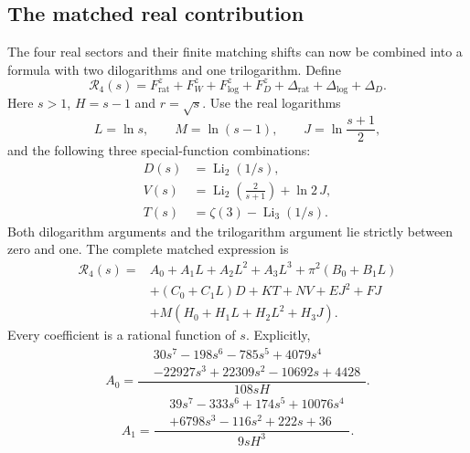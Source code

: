 \subsection{The matched real contribution}
The four real sectors and their finite matching shifts can now be combined into a formula with two dilogarithms and one trilogarithm. Define
\begin{equation}
 \mathcal R_4(s)=F_{\mathrm{rat}}^z+F_W^z+F_{\log}^z+F_D^z
                    +\Delta_{\mathrm{rat}}+\Delta_{\log}+\Delta_D.
\end{equation}
Here $s>1$, $H=s-1$ and $r=\sqrt{s}$. Use the real logarithms
\begin{equation}
 L=\ln s,\qquad M=\ln(s-1),\qquad J=\ln\frac{s+1}{2},
\end{equation}
and the following three special-function combinations:
\begin{align}
 D(s)&=\operatorname{Li}_2(1/s),\\
 V(s)&=\operatorname{Li}_2\!\left(\frac2{s+1}\right)+\ln2\,J,\\
 T(s)&=\zeta(3)-\operatorname{Li}_3(1/s).
\end{align}
Both dilogarithm arguments and the trilogarithm argument lie strictly between zero and one. The complete matched expression is
\begin{equation}
\begin{aligned}
 \mathcal R_4(s)={}&A_0+A_1L+A_2L^2+A_3L^3
                  +\pi^2(B_0+B_1L)\\
 &+(C_0+C_1L)D+KT+NV+EJ^2+FJ\\
 &+M(H_0+H_1L+H_2L^2+H_3J).
\end{aligned}
\label{eq:comp-real-four-matched-compact}
\end{equation}
Every coefficient is a rational function of $s$. Explicitly,
\begin{equation}
A_0=\frac{\begin{aligned}&30 s^{7} - 198 s^{6} - 785 s^{5} + 4079 s^{4}\\&- 22927 s^{3} + 22309 s^{2} - 10692 s + 4428\end{aligned}}{108 s H}.
\end{equation}
\begin{equation}
A_1=\frac{\begin{aligned}&39 s^{7} - 333 s^{6} + 174 s^{5} + 10076 s^{4}\\&+6798 s^{3} - 116 s^{2} + 222 s + 36\end{aligned}}{9 s H^{3}}.
\end{equation}
